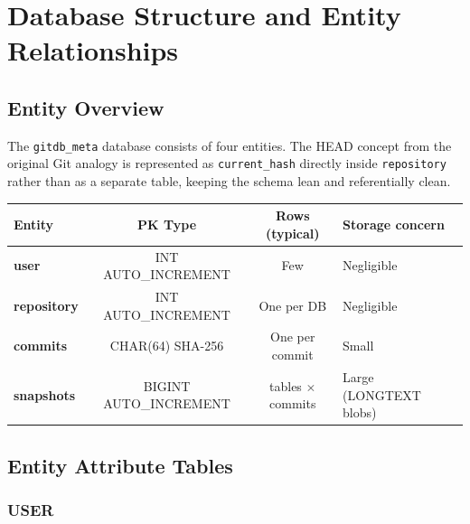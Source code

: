 \documentclass[12pt, a4paper]{article}
\begin{document}
\section{Database Structure and Entity Relationships}

\subsection{Entity Overview}

The \texttt{gitdb\_meta} database consists of four entities. The HEAD concept
from the original Git analogy is represented as \texttt{current\_hash} directly
inside \texttt{repository} rather than as a separate table, keeping the schema
lean and referentially clean.

\begin{center}
\renewcommand{\arraystretch}{1.4}
\begin{tabular}{>{\bfseries\ttfamily}l c c l}
\toprule
\textbf{Entity} & \textbf{PK Type} & \textbf{Rows (typical)} & \textbf{Storage concern} \\
\midrule
user       & INT AUTO\_INCREMENT  & Few               & Negligible \\
repository & INT AUTO\_INCREMENT  & One per DB        & Negligible \\
commits    & CHAR(64) SHA-256     & One per commit    & Small \\
snapshots  & BIGINT AUTO\_INCREMENT & tables $\times$ commits & Large (LONGTEXT blobs) \\
\bottomrule
\end{tabular}
\end{center}

\subsection{Entity Attribute Tables}

\subsubsection{USER}
\end{document}
